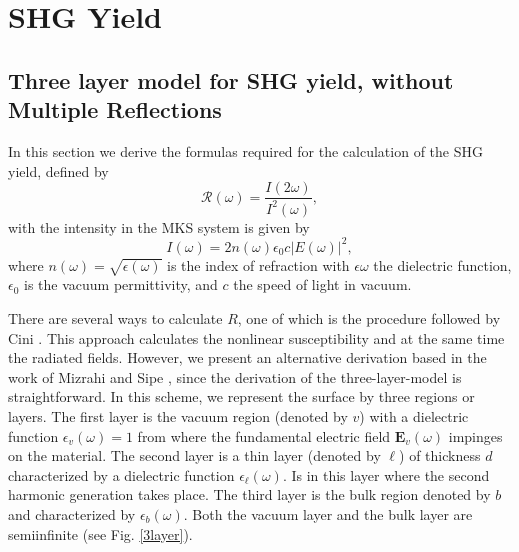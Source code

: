 \documentclass[10pt]{book}
\begin{document}
\chapter{SHG Yield}

\section{Three layer model for SHG yield, without Multiple Reflections}

In this section we derive the formulas required for the calculation of the SHG
yield, defined by
\begin{equation}\label{uno}
\mathcal{R}(\omega)=\frac{I(2\omega)}{I^2(\omega)}
,
\end{equation}
with the intensity in the MKS system is given by\cite{boyd}
\begin{equation}\label{dos}
I(\omega)=2n(\omega)\epsilon_{0}c
|E(\omega)|^2
,
\end{equation}
where $n(\omega)=\sqrt{\epsilon(\omega)}$ is the index of refraction with
$\epsilon\omega$ the dielectric function, $\epsilon_{0}$ is the vacuum permittivity,
and $c$ the speed of light in vacuum.

There are several ways to calculate $R$, one of which is the procedure followed
by Cini \cite{ciniPRB91}. This approach calculates the nonlinear susceptibility
and at the same time the radiated fields. However, we present an alternative
derivation based in the work of Mizrahi and Sipe \cite{mizrahiJOSA88}, since
the derivation of the three-layer-model is straightforward. 
In this scheme, 
we represent the surface by three regions or layers. The first layer
is the vacuum region (denoted by $v$) with a dielectric function $\epsilon_v(\omega)=1$ from
where the fundamental electric field $\mathbf{E}_v(\omega)$ impinges on the material. 
The second  layer is a thin layer (denoted by $\ell$) of thickness $d$ characterized
by a dielectric function $\epsilon_\ell(\omega)$. Is in this layer where the
second harmonic generation takes place. The third layer is the bulk
region denoted by $b$ and characterized by $\epsilon_b(\omega)$. 
Both the vacuum layer and the
bulk layer are semiinfinite  (see Fig. \ref{3layer}). 
\end{document}
